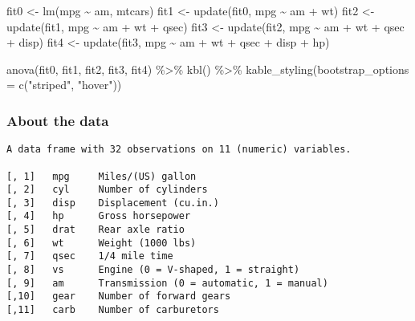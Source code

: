 \documentclass[
]{article}
\newenvironment{Shaded}{\begin{snugshade}}{\end{snugshade}}
\newcommand{\AttributeTok}[1]{\textcolor[rgb]{0.77,0.63,0.00}{#1}}
\newcommand{\FunctionTok}[1]{\textcolor[rgb]{0.00,0.00,0.00}{#1}}
\newcommand{\NormalTok}[1]{#1}
\newcommand{\OtherTok}[1]{\textcolor[rgb]{0.56,0.35,0.01}{#1}}
\newcommand{\SpecialCharTok}[1]{\textcolor[rgb]{0.00,0.00,0.00}{#1}}
\newcommand{\StringTok}[1]{\textcolor[rgb]{0.31,0.60,0.02}{#1}}
\begin{document}
\begin{Shaded}
\begin{Highlighting}[]
\NormalTok{fit0 }\OtherTok{\textless{}{-}} \FunctionTok{lm}\NormalTok{(mpg }\SpecialCharTok{\textasciitilde{}}\NormalTok{ am, mtcars)}
\NormalTok{fit1 }\OtherTok{\textless{}{-}} \FunctionTok{update}\NormalTok{(fit0, mpg }\SpecialCharTok{\textasciitilde{}}\NormalTok{ am }\SpecialCharTok{+}\NormalTok{ wt)}
\NormalTok{fit2 }\OtherTok{\textless{}{-}} \FunctionTok{update}\NormalTok{(fit1, mpg }\SpecialCharTok{\textasciitilde{}}\NormalTok{ am }\SpecialCharTok{+}\NormalTok{ wt }\SpecialCharTok{+}\NormalTok{ qsec)}
\NormalTok{fit3 }\OtherTok{\textless{}{-}} \FunctionTok{update}\NormalTok{(fit2, mpg }\SpecialCharTok{\textasciitilde{}}\NormalTok{ am }\SpecialCharTok{+}\NormalTok{ wt }\SpecialCharTok{+}\NormalTok{ qsec }\SpecialCharTok{+}\NormalTok{ disp)}
\NormalTok{fit4 }\OtherTok{\textless{}{-}} \FunctionTok{update}\NormalTok{(fit3, mpg }\SpecialCharTok{\textasciitilde{}}\NormalTok{ am }\SpecialCharTok{+}\NormalTok{ wt }\SpecialCharTok{+}\NormalTok{ qsec }\SpecialCharTok{+}\NormalTok{ disp }\SpecialCharTok{+}\NormalTok{ hp)}

\FunctionTok{anova}\NormalTok{(fit0, fit1, fit2, fit3, fit4)  }\SpecialCharTok{\%\textgreater{}\%}
  \FunctionTok{kbl}\NormalTok{() }\SpecialCharTok{\%\textgreater{}\%}
  \FunctionTok{kable\_styling}\NormalTok{(}\AttributeTok{bootstrap\_options =} \FunctionTok{c}\NormalTok{(}\StringTok{"striped"}\NormalTok{, }\StringTok{"hover"}\NormalTok{))}
\end{Highlighting}
\end{Shaded}

\pagebreak

\hypertarget{about-the-data}{%
\subsubsection{About the data}\label{about-the-data}}

\begin{verbatim}
A data frame with 32 observations on 11 (numeric) variables.

[, 1]   mpg     Miles/(US) gallon
[, 2]   cyl     Number of cylinders
[, 3]   disp    Displacement (cu.in.)
[, 4]   hp      Gross horsepower
[, 5]   drat    Rear axle ratio
[, 6]   wt      Weight (1000 lbs)
[, 7]   qsec    1/4 mile time
[, 8]   vs      Engine (0 = V-shaped, 1 = straight)
[, 9]   am      Transmission (0 = automatic, 1 = manual)
[,10]   gear    Number of forward gears
[,11]   carb    Number of carburetors
\end{verbatim}
\end{document}
